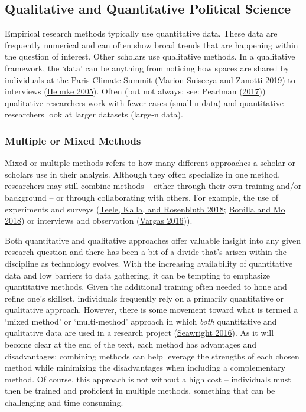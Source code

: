 \documentclass{book}
\begin{document}
\hypertarget{qualitative-and-quantitative-political-science}{%
\subsection{Qualitative and Quantitative Political
Science}\label{qualitative-and-quantitative-political-science}}

Empirical research methods typically use quantitative data. These data are
frequently numerical and can often show broad trends that are happening within
the question of interest. Other scholars use qualitative methods. In a
qualitative framework, the `data' can be anything from noticing how spaces are
shared by individuals at the Paris Climate Summit
(\protect\hyperlink{ref-marionsuiseeyaMakingInfluenceVisible2019}{Marion
Suiseeya and Zanotti 2019}) to interviews
(\protect\hyperlink{ref-helmkeCourtsConstraintsJudges2005}{Helmke 2005}).
Often (but not always; see: Pearlman
(\protect\hyperlink{ref-pearlmanWeCrossedBridge2017}{2017})) qualitative
researchers work with fewer cases (small-n data) and quantitative researchers
look at larger datasets (large-n data).

\hypertarget{multiple-or-mixed-methods}{%
\subsubsection{Multiple or Mixed Methods}\label{multiple-or-mixed-methods}}

Mixed or multiple methods refers to how many different approaches a scholar or
scholars use in their analysis. Although they often specialize in one method,
researchers may still combine methods -- either through their own training
and/or background -- or through collaborating with others. For example, the
use of experiments and surveys
(\protect\hyperlink{ref-teele_kalla_rosenbluth_2018}{Teele, Kalla, and
Rosenbluth 2018}; \protect\hyperlink{ref-bonilla_mo_2018}{Bonilla and Mo
2018}) or interviews and observation
(\protect\hyperlink{ref-vargas2016wounded}{Vargas 2016})).

Both quantitative and qualitative approaches offer valuable insight into any
given research question and there has been a bit of a divide that's arisen
within the discipline as technology evolves. With the increasing availability
of quantitative data and low barriers to data gathering, it can be tempting to
emphasize quantitative methods. Given the additional training often needed to
hone and refine one's skillset, individuals frequently rely on a primarily
quantitative or qualitative approach. However, there is some movement toward
what is termed a `mixed method' or `multi-method' approach in which
\emph{both} quantitative and qualitative data are used in a research project
(\protect\hyperlink{ref-seawrightMultiMethodSocialScience2016}{Seawright
2016}). As it will become clear at the end of the text, each method has
advantages and disadvantages: combining methods can help leverage the
strengths of each chosen method while minimizing the disadvantages when
including a complementary method. Of course, this approach is not without a
high cost -- individuals must then be trained and proficient in multiple
methods, something that can be challenging and time consuming.
\end{document}
